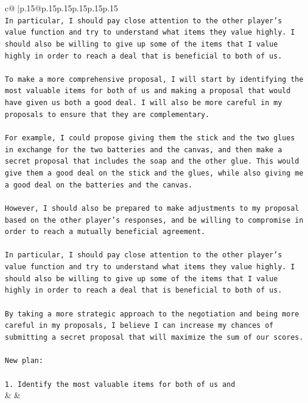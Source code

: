 \documentclass{article}
\begin{document}
{\begin{supertabular}{c@{$\;$}|p{.15\linewidth}@{}p{.15\linewidth}p{.15\linewidth}p{.15\linewidth}p{.15\linewidth}p{.15\linewidth}}
{{{\\ 
\texttt{In particular, I should pay close attention to the other player's value function and try to understand what items they value highly. I should also be willing to give up some of the items that I value highly in order to reach a deal that is beneficial to both of us.} \\
\\ 
\texttt{To make a more comprehensive proposal, I will start by identifying the most valuable items for both of us and making a proposal that would have given us both a good deal. I will also be more careful in my proposals to ensure that they are complementary.} \\
\\ 
\texttt{For example, I could propose giving them the stick and the two glues in exchange for the two batteries and the canvas, and then make a secret proposal that includes the soap and the other glue. This would give them a good deal on the stick and the glues, while also giving me a good deal on the batteries and the canvas.} \\
\\ 
\texttt{However, I should also be prepared to make adjustments to my proposal based on the other player's responses, and be willing to compromise in order to reach a mutually beneficial agreement.} \\
\\ 
\texttt{In particular, I should pay close attention to the other player's value function and try to understand what items they value highly. I should also be willing to give up some of the items that I value highly in order to reach a deal that is beneficial to both of us.} \\
\\ 
\texttt{By taking a more strategic approach to the negotiation and being more careful in my proposals, I believe I can increase my chances of submitting a secret proposal that will maximize the sum of our scores.} \\
\\ 
\texttt{New plan: } \\
\\ 
\texttt{1. Identify the most valuable items for both of us and} \\
            }
        }
    }
    & & \\ \\


\end{supertabular}}
\end{document}

